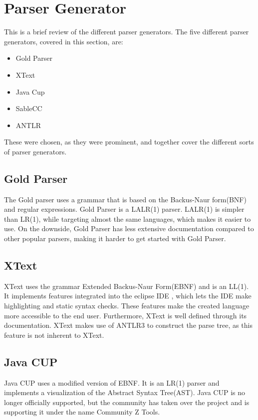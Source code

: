 \section{Parser Generator}\label{sec:pgen}
This is a brief review of the different parser generators. The five different parser generators, covered in this section, are:

\begin{itemize}
    \item Gold Parser
    \item XText
    \item Java Cup
    \item SableCC
    \item ANTLR
\end{itemize}
These were chosen, as they were prominent, and together cover the different sorts of parser generators.

\subsection{Gold Parser}
The Gold parser uses a grammar that is based on the Backus-Naur form(BNF) and regular expressions. Gold Parser is a LALR(1) parser. LALR(1) is simpler than LR(1), while targeting almost the same languages, which makes it easier to use. 
On the downside, Gold Parser has less extensive documentation compared to other popular parsers, making it harder to get started with Gold Parser.

\subsection{XText}
XText uses the grammar Extended Backus-Naur Form(EBNF) and is an LL(1). It implements features integrated into the eclipse IDE \cite{eclipse}, which lets the IDE make highlighting and static syntax checks. These features make the created language more accessible to the end user. Furthermore, XText is well defined through its documentation. XText makes use of ANTLR3 to construct the parse tree, as this feature is not inherent to XText.

\subsection{Java CUP}
Java CUP uses a modified version of EBNF. It is an LR(1) parser and implements a visualization of the  Abstract Syntax Tree(AST). Java CUP is no longer officially supported, but the community has taken over the project and is supporting it under the name Community Z Tools.

